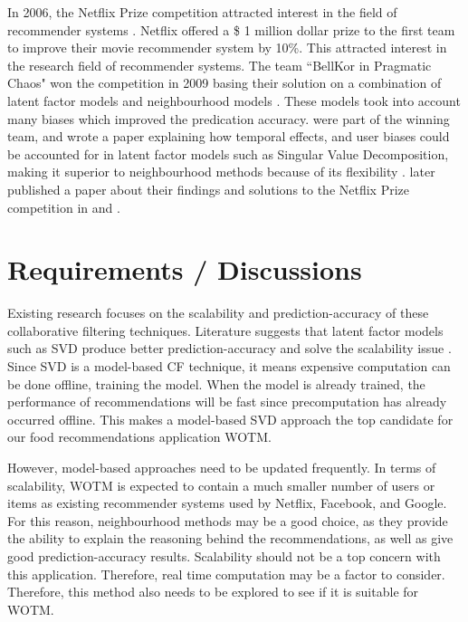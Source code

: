 In 2006, the Netflix Prize competition attracted interest in the field of recommender systems \cite{survey}. Netflix offered a \$ 1 million dollar prize to the first team to improve their movie recommender system by 10\%. This attracted interest in the research field of recommender systems. The team ``BellKor in Pragmatic Chaos" won the competition in 2009 basing their solution on a combination of latent factor models and neighbourhood models \cite{winning, survey}. These models took into account many biases which improved the predication accuracy. \citeauthor{koren2009matrix} were part of the winning team, and wrote a paper explaining how temporal effects, and user biases could be accounted for in latent factor models such as Singular Value Decomposition, making it superior to neighbourhood methods because of its flexibility \cite{koren2009matrix}. \citeauthor{koren2011} later published a paper about their findings and solutions to the Netflix Prize competition in \cite{koren2011} and \cite{winners}.


\section{Requirements / Discussions}


Existing research focuses on the scalability and prediction-accuracy of these collaborative filtering techniques. Literature suggests that latent factor models such as SVD produce better prediction-accuracy and solve the scalability issue . Since SVD is a model-based CF technique, it means expensive computation can be done offline, training the model. When the model is already trained, the performance of recommendations will be fast  since precomputation has already occurred offline. This makes a model-based SVD approach the top candidate for our food recommendations application WOTM. 

However, model-based approaches need to be updated frequently. In terms of scalability, WOTM is expected to contain a much smaller number of users or items as existing recommender systems used by Netflix, Facebook, and Google. For this reason, neighbourhood methods may be a good choice, as they provide the ability to explain the reasoning behind the recommendations, as well as give good prediction-accuracy results. Scalability should not be a top concern with this application. Therefore, real time computation may be a factor to consider. Therefore, this method also needs to be explored to see if it is suitable for WOTM.

